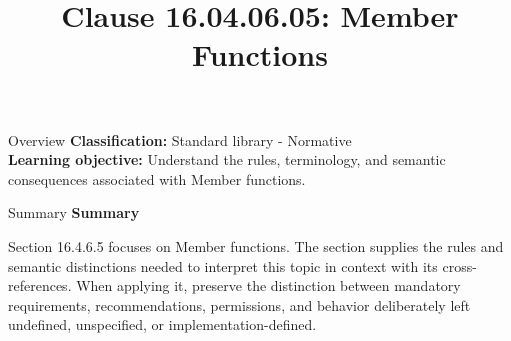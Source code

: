\documentclass[10pt,letterpaper]{article}
\title{Clause 16.04.06.05: Member Functions}
\author{}
\date{}
\begin{document}
\maketitle
\begin{CornellOverviewBox}{Overview}
\textbf{Classification:} Standard library - Normative\\[2pt]
\textbf{Learning objective:} Understand the rules, terminology, and semantic consequences associated with Member functions.
\end{CornellOverviewBox}\begin{CornellSummaryBox}{Summary}
{\sffamily\bfseries\color{Accent} Summary}\par\vspace{3pt}Section 16.4.6.5 focuses on Member functions. The section supplies the rules and semantic distinctions needed to interpret this topic in context with its cross-references. When applying it, preserve the distinction between mandatory requirements, recommendations, permissions, and behavior deliberately left undefined, unspecified, or implementation-defined.
\end{CornellSummaryBox}
\end{document}
